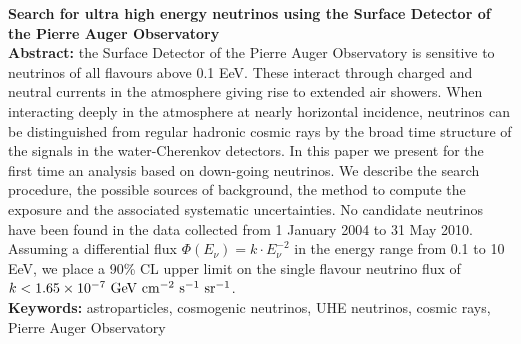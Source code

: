 \begin{titlepage}

$\,$\\[2.5cm]
\textbf{\Large  Search for ultra high energy neutrinos using the Surface Detector of the Pierre Auger Observatory}\\[2.5cm]

\noindent
\textbf{Abstract: } the Surface Detector of the Pierre Auger Observatory is sensitive to neutrinos of all flavours above 0.1 EeV. These
interact through charged and neutral currents in the atmosphere giving rise to extended air showers. When interacting deeply in the
atmosphere at nearly horizontal incidence, neutrinos can be distinguished from regular hadronic cosmic rays by the 
broad time structure of the signals in the water-Cherenkov detectors.
In this paper we present for the first time an analysis based on down-going neutrinos. We describe the search procedure, 
the possible sources of background, the method to compute the exposure and the associated systematic uncertainties.
No candidate neutrinos have been found in the data collected from 1 January 2004 to 31 May 2010. 
Assuming a differential flux $\Phi(E_\nu) = k\cdot E_\nu^{-2}$ in the energy range from 0.1 to 10 EeV, we place a 90\% CL 
upper limit on the single flavour neutrino flux of $k < 1.65 \times 10^{-7}~{\rm GeV~cm^{-2}~s^{-1}~sr^{-1}}$.\\[0.2cm]

\noindent
\textbf{Keywords: } astroparticles, cosmogenic neutrinos, UHE neutrinos, cosmic rays, Pierre Auger Observatory\\

\end{titlepage}